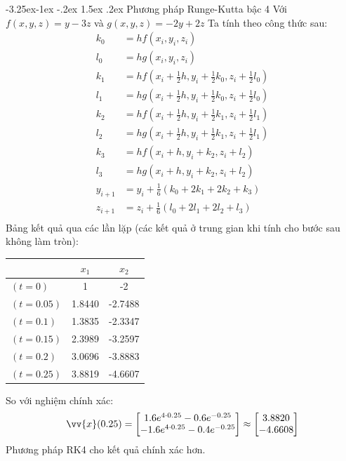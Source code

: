 \documentclass[a4paper]{article}
\makeatletter
\newcounter {subsubsubsection}[subsubsection]
\newcommand\subsubsubsection{\@startsection{subsubsubsection}{4}{\z@}%
                                     {-3.25ex\@plus -1ex \@minus -.2ex}%
                                     {1.5ex \@plus .2ex}%
                                     {\normalfont\normalsize\bfseries}}
\makeatother
\begin{document}
\subsubsubsection{Phương pháp Runge-Kutta bậc 4}
Với $f(x,y,z) = y - 3z$ và  $g(x,y,z) = -2y + 2z$
Ta tính theo công thức sau:
\begin{equation*}
\begin{aligned}
    k_0 &= hf(x_i,y_i,z_i) \\
    l_0 &= hg(x_i,y_i,z_i) \\
    k_1 &= hf(x_i+\frac{1}{2}h,y_i+\frac{1}{2}k_0,z_i+\frac{1}{2}l_0) \\
    l_1 &= hg(x_i+\frac{1}{2}h,y_i+\frac{1}{2}k_0,z_i+\frac{1}{2}l_0) \\
    k_2 &= hf(x_i+\frac{1}{2}h,y_i+\frac{1}{2}k_1,z_i+\frac{1}{2}l_1) \\ 
    l_2 &= hg(x_i+\frac{1}{2}h,y_i+\frac{1}{2}k_1,z_i+\frac{1}{2}l_1) \\
    k_3 &= hf(x_i+h,y_i+k_2,z_i+l_2) \\
    l_3 &= hg(x_i+h,y_i+k_2,z_i+l_2) \\
    y_{i+1} &= y_i + \frac{1}{6}(k_0+2k_1+2k_2+k_3) \\
    z_{i+1} &= z_i + \frac{1}{6}(l_0+2l_1+2l_2+l_3) \\
\end{aligned}
\end{equation*}
Bảng kết quả qua các lần lặp (các kết quả ở trung gian khi tính cho bước sau không làm tròn): \par
\begin{table}[!h]
\begin{tabular}{l|cc}
\multicolumn{1}{c|}{} & $x_1$                    & $x_2$                      \\ \hline
$(t = 0)$         & 1                            & -2                     \\
$(t = 0.05)$      & 1.8440                       & -2.7488                   \\
$(t = 0.1)$       & 1.3835                       & -2.3347                 \\
$(t = 0.15)$      & 2.3989                       & -3.2597       \\
$(t = 0.2)$       & 3.0696                       & -3.8883       \\
$(t = 0.25)$      & 3.8819                       & -4.6607  
\end{tabular}
\end{table}
So với nghiệm chính xác: 
\begin{equation*}
    \vv{x}(0.25) = 
    \begin{bmatrix}
        1.6e^{4\cdot0.25} - 0.6e^{-0.25} \\
        -1.6e^{4\cdot0.25} - 0.4e^{-0.25}
    \end{bmatrix}
    \approx
    \begin{bmatrix}
        3.8820 \\
        -4.6608
    \end{bmatrix}
\end{equation*}
Phương pháp RK4 cho kết quả chính xác hơn.
\end{document}
